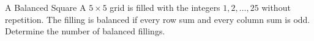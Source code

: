\begin{problem}{A Balanced Square}
    A \(5\times5\) grid is filled with the integers \(1,2,\dots,25\) without repetition. The filling is balanced if every row sum and every column sum is odd. Determine the number of balanced fillings.
    
\end{problem}
